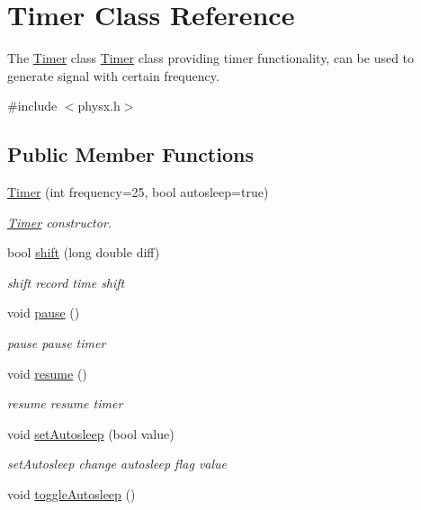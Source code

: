 \hypertarget{classTimer}{}\section{Timer Class Reference}
\label{classTimer}


The \hyperlink{classTimer}{Timer} class \hyperlink{classTimer}{Timer} class providing timer functionality, can be used to generate signal with certain frequency.  




{\ttfamily \#include $<$physx.\+h$>$}

\subsection*{Public Member Functions}
\begin{DoxyCompactItemize}
\item 
\hyperlink{classTimer_a16e1294d6277a44056a2ebe3fa968777}{Timer} (int frequency=25, bool autosleep=true)
\begin{DoxyCompactList}\small\item\em \hyperlink{classTimer}{Timer} constructor. \end{DoxyCompactList}\item 
bool \hyperlink{classTimer_a03bf21c7ffff6c9a00b25c66b46d648d}{shift} (long double diff)
\begin{DoxyCompactList}\small\item\em shift record time shift \end{DoxyCompactList}\item 
\hypertarget{classTimer_a0289effad7b573c508bc27e405900a23}{}void \hyperlink{classTimer_a0289effad7b573c508bc27e405900a23}{pause} ()\label{classTimer_a0289effad7b573c508bc27e405900a23}

\begin{DoxyCompactList}\small\item\em pause pause timer \end{DoxyCompactList}\item 
\hypertarget{classTimer_a4ac55a73bb3431db9d4d2fd70ae9a2e8}{}void \hyperlink{classTimer_a4ac55a73bb3431db9d4d2fd70ae9a2e8}{resume} ()\label{classTimer_a4ac55a73bb3431db9d4d2fd70ae9a2e8}

\begin{DoxyCompactList}\small\item\em resume resume timer \end{DoxyCompactList}\item 
void \hyperlink{classTimer_a800180c46d170e8d7821d08508cc1945}{set\+Autosleep} (bool value)
\begin{DoxyCompactList}\small\item\em set\+Autosleep change autosleep flag value \end{DoxyCompactList}\item 
\hypertarget{classTimer_afc90ad6e658d90ec64f338867044c609}{}void \hyperlink{classTimer_afc90ad6e658d90ec64f338867044c609}{toggle\+Autosleep} ()\label{classTimer_afc90ad6e658d90ec64f338867044c609}


\end{DoxyCompactItemize}
